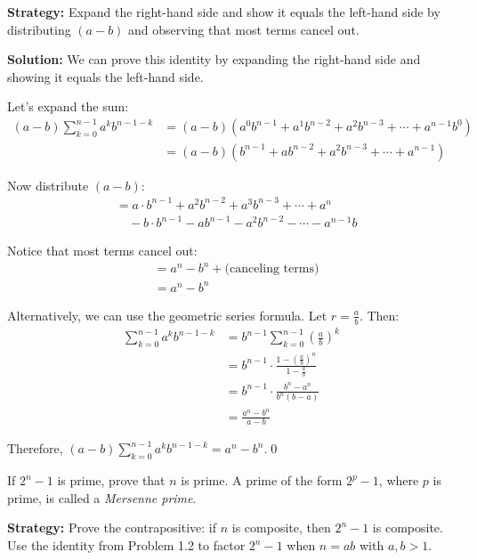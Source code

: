 \noindent\textbf{Strategy:} Expand the right-hand side and show it equals the left-hand side by distributing $(a-b)$ and observing that most terms cancel out.

\bigskip\noindent\textbf{Solution:}
We can prove this identity by expanding the right-hand side and showing it equals the left-hand side.

Let's expand the sum:
\begin{align*}
(a - b)\sum_{k=0}^{n-1} a^k b^{n-1-k} &= (a - b)(a^0 b^{n-1} + a^1 b^{n-2} + a^2 b^{n-3} + \cdots + a^{n-1} b^0) \\
&= (a - b)(b^{n-1} + a b^{n-2} + a^2 b^{n-3} + \cdots + a^{n-1})
\end{align*}

Now distribute $(a - b)$:
\begin{align*}
&= a \cdot b^{n-1} + a^2 b^{n-2} + a^3 b^{n-3} + \cdots + a^n \\
&\quad - b \cdot b^{n-1} - a b^{n-1} - a^2 b^{n-2} - \cdots - a^{n-1} b
\end{align*}

Notice that most terms cancel out:
\begin{align*}
&= a^n - b^n + \text{(canceling terms)} \\
&= a^n - b^n
\end{align*}

Alternatively, we can use the geometric series formula. Let $r = \frac{a}{b}$. Then:
\begin{align*}
\sum_{k=0}^{n-1} a^k b^{n-1-k} &= b^{n-1} \sum_{k=0}^{n-1} \left(\frac{a}{b}\right)^k \\
&= b^{n-1} \cdot \frac{1 - \left(\frac{a}{b}\right)^n}{1 - \frac{a}{b}} \\
&= b^{n-1} \cdot \frac{b^n - a^n}{b^n(b - a)} \\
&= \frac{a^n - b^n}{a - b}
\end{align*}

Therefore, $(a - b)\sum_{k=0}^{n-1} a^k b^{n-1-k} = a^n - b^n$.\qed



\begin{problembox}
\begin{problemstatement}
If $2^n - 1$ is prime, prove that $n$ is prime. A prime of the form $2^p - 1$, where $p$ is prime, is called a \textit{Mersenne prime}.
\end{problemstatement}
\end{problembox}

\noindent\textbf{Strategy:} Prove the contrapositive: if $n$ is composite, then $2^n - 1$ is composite. Use the identity from Problem 1.2 to factor $2^n - 1$ when $n = ab$ with $a, b > 1$.

